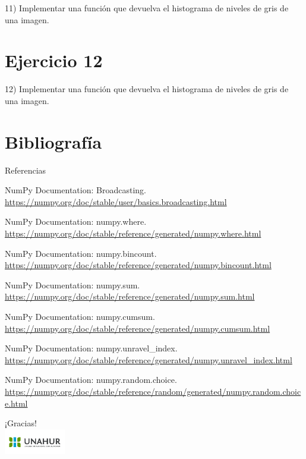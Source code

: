 \documentclass{beamer}
\begin{document}
\begin{frame}
	\begin{center}
		11) Implementar una función que devuelva el histograma de niveles de gris de una imagen.
	\end{center}
\end{frame}

\section{Ejercicio 12}

\begin{frame}
	\begin{center}
		12) Implementar una función que devuelva el histograma de niveles de gris de una imagen.
	\end{center}
\end{frame}

\section{Bibliografía}
	
	\begin{frame}{Referencias}
		\tiny
		\begin{thebibliography}{10}
			\beamertemplatebookbibitems
			NumPy Documentation: Broadcasting. 
			\newblock \url{https://numpy.org/doc/stable/user/basics.broadcasting.html}
			
			NumPy Documentation: numpy.where. 
			\newblock \url{https://numpy.org/doc/stable/reference/generated/numpy.where.html}
			
			NumPy Documentation: numpy.bincount. 
			\newblock \url{https://numpy.org/doc/stable/reference/generated/numpy.bincount.html}
			
			NumPy Documentation: numpy.sum. 
			\newblock \url{https://numpy.org/doc/stable/reference/generated/numpy.sum.html}
			
			NumPy Documentation: numpy.cumsum. 
			\newblock \url{https://numpy.org/doc/stable/reference/generated/numpy.cumsum.html}
			
			NumPy Documentation: numpy.unravel\_index. 
			\newblock \url{https://numpy.org/doc/stable/reference/generated/numpy.unravel_index.html}
			
			NumPy Documentation: numpy.random.choice. 
			\newblock \url{https://numpy.org/doc/stable/reference/random/generated/numpy.random.choice.html}
		\end{thebibliography}
	\end{frame}
	
	\begin{frame}{}
		\centering
		{\huge ¡Gracias!}\\
		\vspace{1cm}
		\includegraphics[width=0.2\textwidth]{UNAHUR.png}
	\end{frame}
	
\end{document}
